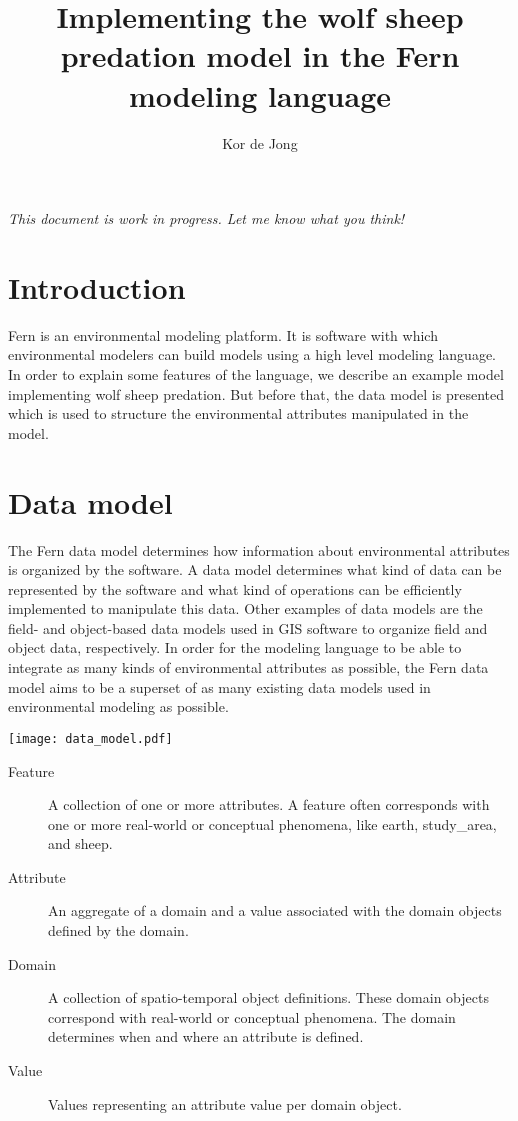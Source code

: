 \documentclass[10pt, a4paper]{article}
\begin{document}
\title{Implementing the wolf sheep predation model in the Fern modeling language}
\author{Kor de Jong}
\maketitle

\emph{This document is work in progress. Let me know what you think!}

\section{Introduction}
Fern is an environmental modeling platform. It is software with which environmental modelers can build models using a high level modeling language. In order to explain some features of the language, we describe an example model implementing wolf sheep predation. But before that, the data model is presented which is used to structure the environmental attributes manipulated in the model.

\section{Data model}
The Fern data model determines how information about environmental attributes is organized by the software. A data model determines what kind of data can be represented by the software and what kind of operations can be efficiently implemented to manipulate this data. Other examples of data models are the field- and object-based data models used in GIS software to organize field and object data, respectively. In order for the modeling language to be able to integrate as many kinds of environmental attributes as possible, the Fern data model aims to be a superset of as many existing data models used in environmental modeling as possible.

\texttt{[image: data\_model.pdf]}

\begin{description}
    \item[Feature] A collection of one or more attributes. A feature often corresponds with one or more real-world or conceptual phenomena, like earth, study\_area, and sheep.
    \item[Attribute] An aggregate of a domain and a value associated with the domain objects defined by the domain.
    \item[Domain] A collection of spatio-temporal object definitions. These domain objects correspond with real-world or conceptual phenomena. The domain determines when and where an attribute is defined.
    \item[Value] Values representing an attribute value per domain object.
\end{description}
\end{document}
